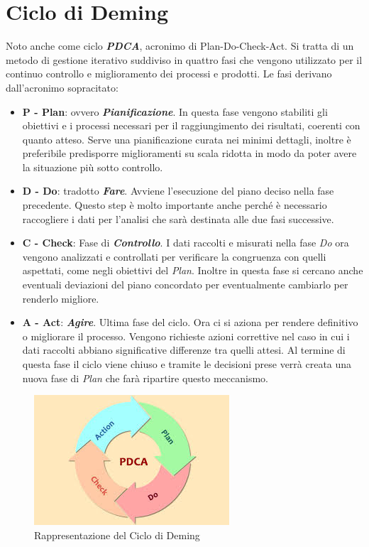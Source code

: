 \chapter{Ciclo di Deming}\label{CicloDiDeming}
Noto anche come ciclo \textbf{\textit{PDCA}}, acronimo di Plan-Do-Check-Act.
Si tratta di un metodo di gestione iterativo suddiviso in quattro fasi che vengono utilizzato per il continuo controllo e miglioramento dei processi e prodotti.
Le fasi derivano dall’acronimo sopracitato:
\begin{itemize}
	\item \textbf{P - Plan}:  ovvero \textbf{\textit{Pianificazione}}. In questa fase vengono stabiliti gli obiettivi e i processi necessari per il raggiungimento dei risultati, coerenti con quanto atteso.
	Serve una pianificazione curata nei minimi dettagli, inoltre è preferibile predisporre miglioramenti su scala ridotta in modo da poter avere la situazione più sotto controllo.
	\item \textbf{D - Do}: tradotto \textbf{\textit{Fare}}. Avviene l’esecuzione del piano deciso nella fase precedente.
	Questo step è molto importante anche perché è necessario raccogliere i dati per l’analisi che sarà destinata alle due fasi successive.
	\item \textbf{C - Check}: Fase di \textbf{\textit{Controllo}}. I dati raccolti e misurati nella fase \textit{Do} ora vengono analizzati e controllati per verificare la congruenza con quelli aspettati, come negli obiettivi del \textit{Plan}.
	Inoltre in questa fase si cercano anche eventuali deviazioni del piano concordato per eventualmente cambiarlo per renderlo migliore.
	\item \textbf{A - Act}: \textbf{\textit{Agire}}. Ultima fase del ciclo. Ora ci si aziona per rendere definitivo o migliorare il processo. Vengono richieste azioni correttive nel caso in cui i dati raccolti abbiano significative differenze tra quelli attesi. 
	Al termine di questa fase il ciclo viene chiuso e tramite le decisioni prese verrà creata una nuova fase di \textit{Plan} che farà ripartire questo meccanismo.
\end{itemize}
\begin{figure}[!ht]
	\begin{center}
		\includegraphics[width=0.48\linewidth]{../immagini/Ciclo_di_Deming.jpg}
		\caption{Rappresentazione del Ciclo di Deming}
	\end{center}
\end{figure}

